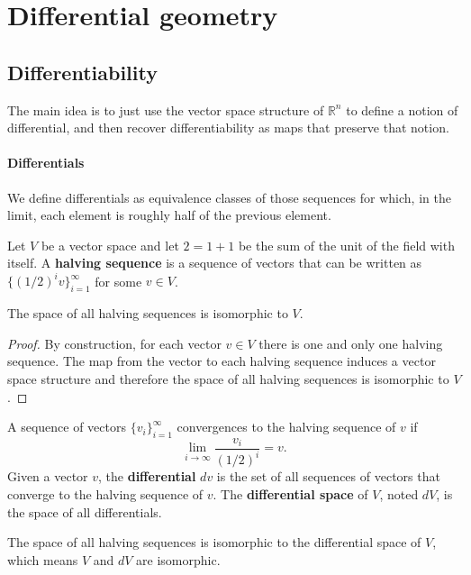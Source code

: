 \chapter{Differential geometry}

\section{Differentiability}

The main idea is to just use the vector space structure of $\mathbb{R}^n$ to define a notion of differential, and then recover differentiability as maps that preserve that notion.

\subsubsection{Differentials}

We define differentials as equivalence classes of those sequences for which, in the limit, each element is roughly half of the previous element.

\begin{defn}
Let $V$ be a vector space and let $2=1+1$ be the sum of the unit of the field with itself. A \textbf{halving sequence} is a sequence of vectors that can be written as $\{(1/2)^i v\}_{i=1}^{\infty}$ for some $v \in V$.
\end{defn}

\begin{prop}
	The space of all halving sequences is isomorphic to $V$.
\end{prop}

\begin{proof}
	By construction, for each vector $v \in V$ there is one and only one halving sequence. The map from the vector to each halving sequence induces a vector space structure and therefore the space of all halving sequences is isomorphic to $V$.
\end{proof}

\begin{defn}
A sequence of vectors $\{v_i\}_{i=1}^{\infty}$ convergences to the halving sequence of $v$ if 
$$ \lim\limits_{i \to \infty} \frac{v_i}{(1/2)^i} = v.$$
Given a vector $v$, the \textbf{differential} $dv$ is the set of all sequences of vectors that converge to the halving sequence of $v$. The \textbf{differential space} of $V$, noted $dV$, is the space of all differentials.
\end{defn}

\begin{prop}
The space of all halving sequences is isomorphic to the differential space of $V$, which means $V$ and $dV$ are isomorphic.
\end{prop}

